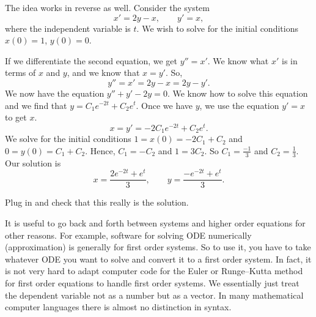 \documentclass{ximera}
\begin{document}
\begin{example}
    The idea works in reverse as well.  Consider the system
    \begin{equation*}
        x' = 2y-x , \qquad y' = x, 
    \end{equation*}
    where the independent variable is $t$.  We wish to solve for the initial conditions $x(0) = 1$, $y(0) =0$.
\end{example}

\begin{exampleSol}
    If we differentiate the second equation, we get $y''=x'$.  We know what $x'$ is in terms of $x$ and $y$, and we know that $x=y'$.  So,
    \begin{equation*}
        y'' = x' = 2y-x = 2y-y' .
    \end{equation*}
    We now have the equation $y''+y'-2y = 0$.  We know how to solve this equation and we find that $y = C_1 e^{-2t} + C_2 e^t$.  Once we have $y$, we use the equation $y' = x$ to get $x$.
    \begin{equation*}
        x = y' = -2 C_1 e^{-2t} + C_2 e^t .
    \end{equation*}
    We solve for the initial conditions $1 = x(0) = -2 C_1 + C_2$ and $0 = y(0) = C_1 + C_2$.  Hence, $C_1 = -C_2$ and $1 = 3C_2$. So $C_1 = \frac{-1}{3}$ and $C_2 = \frac{1}{3}$.  Our solution is
    \begin{equation*}
        x = \frac{2e^{-2t} + e^t}{3} ,\qquad y = \frac{-e^{-2t} + e^t}{3} .
    \end{equation*}
\end{exampleSol}

\begin{exercise}
    Plug in and check that this really is the solution.
\end{exercise}

It is useful to go back and forth between systems and higher order equations for other reasons.  For example, software for solving ODE numerically (approximation) is generally for first order systems.  So to use it, you have to take whatever ODE you want to solve and convert it to a first order system.  In fact, it is not very hard to adapt computer code for the Euler or Runge--Kutta method for first order equations to handle first order systems.  We essentially just treat the dependent variable not as a number but as a vector.  In many mathematical computer languages there is almost no distinction in syntax.

\end{document}
